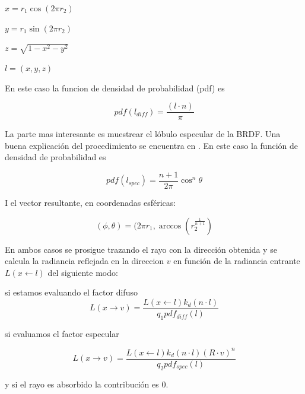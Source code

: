 \smallskip

$x = r_1 \cos (2\pi r_2)$

\smallskip

$y = r_1 \sin (2\pi r_2)$

\smallskip

$z = \sqrt{1 - x^2 - y^2}$

\smallskip

$l = (x, y, z)$

\medskip

En este caso la funcion de densidad de probabilidad (pdf) es

\smallskip

\begin{equation}
pdf(l_{diff}) = \frac{(l \cdot n)}{\pi}
\end{equation}

La parte mas interesante es muestrear el lóbulo especular de la BRDF. Una buena explicación del procedimiento se encuentra en \cite{Lafortune1994}. En este caso la función de densidad de probabilidad es

\begin{equation}
pdf(l_{spec}) = \frac{n + 1}{2\pi}\cos^n\theta
\end{equation}

I el vector resultante, en coordenadas esféricas:

\begin{equation}
(\phi, \theta) = (2\pi r_1, \arccos(r_2^{\frac{1}{n+1}}) 
\end{equation}

En ambos casos se prosigue trazando el rayo con la dirección obtenida y se calcula la radiancia reflejada en la direccion $v$ en función de la radiancia entrante $L(x \gets l)$ del siguiente modo:
\medskip

si estamos evaluando el factor difuso
\begin{equation}
L(x \to v) = \frac{L(x \gets l)k_d(n \cdot l)}{q_1 pdf_{diff}(l)}
\end{equation}

si evaluamos el factor especular

\begin{equation}
L(x \to v) = \frac{L(x \gets l)k_d(n \cdot l)(R \cdot v)^n}{q_2 pdf_{spec}(l)}
\end{equation}

y si el rayo es absorbido la contribución es 0.




\clearpage

